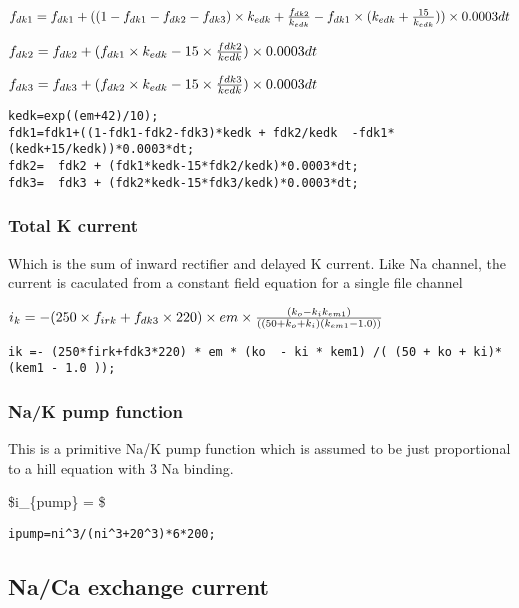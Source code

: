 \documentclass[11pt]{article}
\begin{document}
\(\large f_{dk1} = f_{dk1}+ ((1-f_{dk1}-f_{dk2}-f_{dk3})\times k_{edk}+\frac{f_{dk2}}{k_{edk}}-f_{dk1}\times(k_{edk}+\frac{15}{k_{edk}})) \times 0.0003dt\)

\(\large f_{dk2} = f_{dk2}+(f_{dk1}\times k_{edk} - 15 \times \frac{f{dk2}}{kedk}) \times 0.0003 dt\)

\(\large f_{dk3} = f_{dk3}+ (f_{dk2} \times k_{edk}-15 \times \frac{f{dk3}}{k{edk}}) \times 0.0003dt\)

    \begin{verbatim}
kedk=exp((em+42)/10);
fdk1=fdk1+((1-fdk1-fdk2-fdk3)*kedk + fdk2/kedk  -fdk1*(kedk+15/kedk))*0.0003*dt;
fdk2=  fdk2 + (fdk1*kedk-15*fdk2/kedk)*0.0003*dt;
fdk3=  fdk3 + (fdk2*kedk-15*fdk3/kedk)*0.0003*dt;
\end{verbatim}

    \subsubsection{Total K current}\label{total-k-current}

Which is the sum of inward rectifier and delayed K current. Like Na
channel, the current is caculated from a constant field equation for a
single file channel

    \(\large i_k = -(250 \times f_{irk}+ f_{dk3} \times 220) \times em \times \frac{(k_o-k_ik_{em1})}{((50+k_o+k_i)(k_{em1} - 1.0))}\)

    \texttt{ik\ =-\ (250*firk+fdk3*220)\ *\ em\ *\ (ko\ \ -\ ki\ *\ kem1)\ /(\ (50\ +\ ko\ +\ ki)*(kem1\ -\ 1.0\ ));}

    \subsubsection{Na/K pump function}\label{nak-pump-function}

This is a primitive Na/K pump function which is assumed to be just
proportional to a hill equation with 3 Na binding.

    \$\large i\_\{pump\} =    \$

    \begin{verbatim}
ipump=ni^3/(ni^3+20^3)*6*200;
\end{verbatim}

    \subsection{Na/Ca exchange current}\label{naca-exchange-current}
\end{document}
